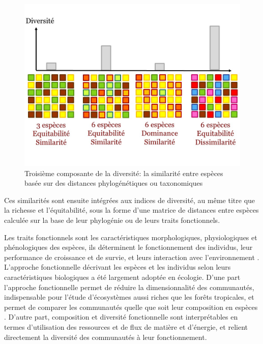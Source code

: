 \documentclass[
  11pt,
  french,
  A4paper,
  extrafontsizes,onecolumn,openright
  ]{memoir}
\begin{document}
\begin{figure}

{\centering \includegraphics[width=0.6\linewidth]{ExternalFig/Fig_RichnessEquitabilitySimilarity} 

}

\caption{Troisième composante de la diversité: la similarité entre espèces basée sur des distances phylogénétiques ou taxonomiques}\label{fig:RichEquSim}
\end{figure}

Ces similarités sont ensuite intégrées aux indices de diversité, au même
titre que la richesse et l'équitabilité, sous la forme d'une matrice de
distances entre espèces calculée sur la base de leur phylogénie ou de
leurs traits fonctionnels.

Les traits fonctionnels sont les caractéristiques morphologiques,
physiologiques et phénologiques des espèces, ils déterminent le
fonctionnement des individus, leur performance de croissance et de
survie, et leurs interaction avec l'environnement
\autocite{Violle2007b}. L'approche fonctionnelle décrivant les espèces
et les individus selon leurs caractéristiques biologiques a été
largement adoptée en écologie. D'une part l'approche fonctionnelle
permet de réduire la dimensionnalité des communautés, indispensable pour
l'étude d'écosystèmes aussi riches que les forêts tropicales, et permet
de comparer les communautés quelle que soit leur composition en espèces
\autocites{Begon2006}{Scheiter2013}{Mouillot2013a}{Sakschewski2016}.
D'autre part, composition et diversité fonctionnelle sont interprétables
en termes d'utilisation des ressources et de flux de matière et
d'énergie, et relient directement la diversité des communautés à leur
fonctionnement.
\end{document}

